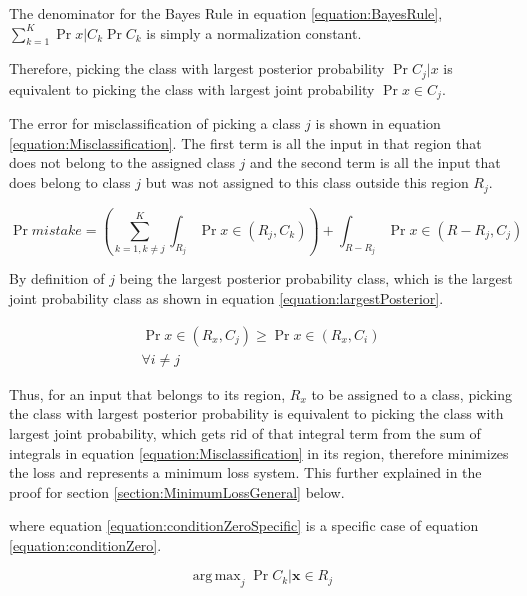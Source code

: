 \documentclass[a4paper,12pt]{article}
\DeclareMathOperator*{\argmax}{arg\,max}
\begin{document}
The denominator for the Bayes Rule in equation \ref{equation:BayesRule}, 
$\sum_{k=1}^{K}  \Pr{x | C_{k}} \Pr{C_{k}}$ is simply a normalization constant. 

Therefore, picking the class with largest posterior probability $\Pr{C_{j} | x}$ is equivalent to picking the class with largest joint probability $\Pr{x \in C_{j}}$. 

The error for misclassification of picking a class $j$ is shown in equation \ref{equation:Misclassification}. 
The first term is all the input in that region that does not belong to the assigned class $j$ and the second term is all the input that does belong to class $j$ but was not assigned to this class outside this region $R_{j}$. 

\begin{equation}
\label{equation:Misclassification}
\Pr{mistake} = (\sum_{k=1, k \neq j}^{K} \int_{R_{j}} \Pr{x \in (R_{j}, C_{k})})  + \int_{R - R_{j}} \Pr{x \in (R -R_{j}, C_{j})}
\end{equation}

By definition of $j$ being the largest posterior probability class, which is the largest joint probability class as shown in equation \ref{equation:largestPosterior}. 

\begin{equation}
\begin{split}
\label{equation:largestPosterior}
\Pr{x \in (R_{x}, C_{j})} \ge  \Pr{x \in (R_{x}, C_{i})} \\
\forall i \neq j
\end{split}
\end{equation}

Thus, for an input that belongs to its region, $R_{x}$ to be assigned to a class, picking the class with largest posterior probability is equivalent to picking the class with largest joint probability, which gets rid of that integral term from the sum of integrals in equation \ref{equation:Misclassification} in its region, therefore minimizes the loss and represents a minimum loss system. This further explained in the proof for section \ref{section:MinimumLossGeneral} below. 

where equation \ref{equation:conditionZeroSpecific} is a specific case of equation \ref{equation:conditionZero}. 

\begin{equation}
\label{equation:conditionZeroSpecific}
\argmax_j \Pr{C_{k} | \mathbf{x} \in R_{j}} 
\end{equation}
\end{document}
